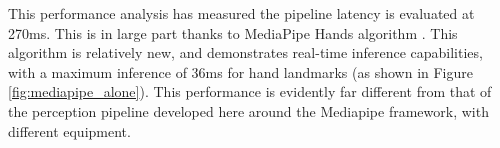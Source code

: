 This performance analysis has measured the pipeline latency is evaluated at 270ms. This is in large part thanks to MediaPipe Hands algorithm \cite{48292}. This algorithm is relatively new, and demonstrates real-time inference capabilities, with a maximum inference of 36ms for hand landmarks (as shown in Figure \ref{fig:mediapipe_alone}). This performance is evidently far different from that of the perception pipeline developed here around the Mediapipe framework, with different equipment. 





